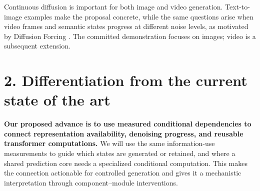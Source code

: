 \documentclass[11pt,letterpaper]{article}
\begin{document}
Continuous diffusion is important for both image and video generation. Text-to-image examples make the proposal concrete, while the same questions arise when video frames and semantic states progress at different noise levels, as motivated by Diffusion Forcing \citep{diffusionforcing}. The committed demonstration focuses on images; video is a subsequent extension.

\hypertarget{differentiation-from-the-current-state-of-the-art}{%
\section{2. Differentiation from the current state of the art}\label{differentiation-from-the-current-state-of-the-art}}

\textbf{Our proposed advance is to use measured conditional dependencies to connect representation availability, denoising progress, and reusable transformer computations.} We will use the same information-use measurements to guide which states are generated or retained, and where a shared prediction core needs a specialized conditional computation. This makes the connection actionable for controlled generation and gives it a mechanistic interpretation through component--module interventions.
\end{document}
